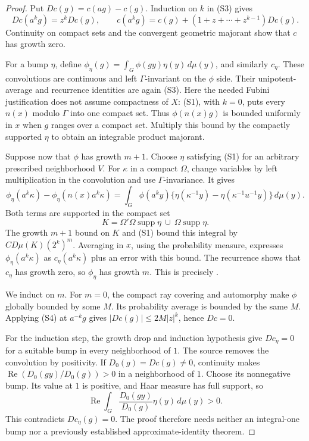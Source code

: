 \begin{proof}
Put \(Dc(g)=c(ag)-c(g)\).
Induction on \(k\) in (S3) gives
\[
 Dc(a^kg)=z^kDc(g),\qquad
 c(a^kg)=c(g)+(1+z+\cdots+z^{k-1})Dc(g).
 \tag{S4}\label{eq:sr-source-contraction-powers}
\]
Continuity on compact sets and the convergent geometric
majorant show that \(c\) has growth zero.

For a bump \(\eta\), define
\(\phi_\eta(g)=\int_G\phi(gy)\eta(y)\,d\mu(y)\),
and similarly \(c_\eta\).
These convolutions are continuous and left
\(\Gamma\)-invariant on the \(\phi\) side.
Their unipotent-average and recurrence identities are again (S3).
Here the needed Fubini justification does not assume
compactness of \(X\): (S1), with \(k=0\), puts every
\(n(x)\) modulo \(\Gamma\) into one compact set.
Thus \(\phi(n(x)g)\) is bounded uniformly in \(x\)
when \(g\) ranges over a compact set.
Multiply this bound by the compactly supported \(\eta\)
to obtain an integrable product majorant.

Suppose now that \(\phi\) has growth \(m+1\).
Choose \(\eta\) satisfying (S1) for an arbitrary prescribed
neighborhood \(V\).
For \(\kappa\) in a compact \(\Omega\), change variables
by left multiplication in the convolution and use
\(\Gamma\)-invariance. It gives
\[
 \phi_\eta(a^k\kappa)-\phi_\eta(n(x)a^k\kappa)
 =\int_G\phi(a^ky)
       \{\eta(\kappa^{-1}y)-\eta(\kappa^{-1}u^{-1}y)\}\,d\mu(y).
\]
Both terms are supported in the compact set
\[
          K=\Omega'\Omega\operatorname{supp}\eta
                          \ \cup\ \Omega\operatorname{supp}\eta.
\]
The growth \(m+1\) bound on \(K\) and (S1) bound this integral
by \(C D\mu(K)(2^k)^m\).
Averaging in \(x\), using the probability measure, expresses
\(\phi_\eta(a^k\kappa)\) as \(c_\eta(a^k\kappa)\) plus
an error with this bound. The recurrence shows that
\(c_\eta\) has growth zero, so \(\phi_\eta\) has growth \(m\).
This is precisely .

We induct on \(m\).
For \(m=0\), the compact ray covering and automorphy make
\(\phi\) globally bounded by some \(M\).
Its probability average is bounded by the same \(M\).
Applying (S4) at \(a^{-k}g\) gives
\(|Dc(g)|\le2M|z|^k\), hence \(Dc=0\).

For the induction step, the growth drop and induction hypothesis
give \(Dc_\eta=0\) for a suitable bump in every neighborhood of \(1\).
The source removes the convolution by positivity.
If \(D_0(g)=Dc(g)\ne0\), continuity makes
\(\operatorname{Re}(D_0(gy)/D_0(g))>0\) in a neighborhood of \(1\).
Choose its nonnegative bump. Its value at \(1\) is positive,
and Haar measure has full support, so
\[
 \operatorname{Re}\int_G
           \frac{D_0(gy)}{D_0(g)}\eta(y)\,d\mu(y)>0.
\]
This contradicts \(Dc_\eta(g)=0\).
The proof therefore needs neither an integral-one bump
nor a previously established approximate-identity theorem.
\end{proof}

